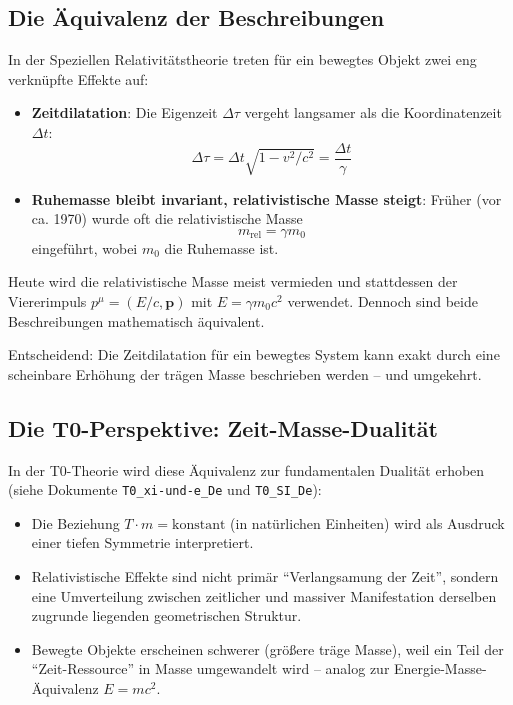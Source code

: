 \subsection{Die Äquivalenz der Beschreibungen}

In der Speziellen Relativitätstheorie treten für ein bewegtes Objekt zwei eng verknüpfte Effekte auf:
\begin{itemize}
	\item \textbf{Zeitdilatation}: Die Eigenzeit \(\Delta \tau\) vergeht langsamer als die Koordinatenzeit \(\Delta t\):
	\[
	\Delta \tau = \Delta t \sqrt{1 - v^2/c^2} = \frac{\Delta t}{\gamma}
	\]
	\item \textbf{Ruhemasse bleibt invariant, relativistische Masse steigt}: Früher (vor ca. 1970) wurde oft die relativistische Masse
	\[
	m_{\text{rel}} = \gamma m_0
	\]
	eingeführt, wobei \(m_0\) die Ruhemasse ist.
\end{itemize}

Heute wird die relativistische Masse meist vermieden und stattdessen der Viererimpuls \(p^\mu = (E/c, \mathbf{p})\) mit \(E = \gamma m_0 c^2\) verwendet. Dennoch sind beide Beschreibungen mathematisch äquivalent.

Entscheidend: Die Zeitdilatation für ein bewegtes System kann exakt durch eine scheinbare Erhöhung der trägen Masse beschrieben werden – und umgekehrt.

\subsection{Die T0-Perspektive: Zeit-Masse-Dualität}

In der T0-Theorie wird diese Äquivalenz zur fundamentalen Dualität erhoben (siehe Dokumente \texttt{T0\_xi-und-e\_De} und \texttt{T0\_SI\_De}):
\begin{itemize}
	\item Die Beziehung \(T \cdot m = \text{konstant}\) (in natürlichen Einheiten) wird als Ausdruck einer tiefen Symmetrie interpretiert.
	\item Relativistische Effekte sind nicht primär ``Verlangsamung der Zeit'', sondern eine Umverteilung zwischen zeitlicher und massiver Manifestation derselben zugrunde liegenden geometrischen Struktur.
	\item Bewegte Objekte erscheinen schwerer (größere träge Masse), weil ein Teil der ``Zeit-Ressource'' in Masse umgewandelt wird – analog zur Energie-Masse-Äquivalenz \(E = mc^2\).
\end{itemize}

